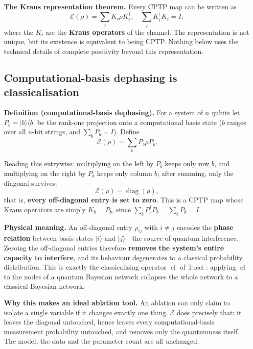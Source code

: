 \documentclass{article}
\begin{document}
\textbf{The Kraus representation theorem.} Every CPTP map can be written
as
\[\mathcal{E}(\rho) = \sum_{i}K_{i}\rho K_{i}^{\dagger},\quad\sum_{i}K_{i}^{\dagger}K_{i} = I,\]
where the \(K_{i}\) are the \textbf{Kraus operators} of the channel. The
representation is not unique, but its existence is equivalent to being
CPTP. Nothing below uses the technical details of complete positivity
beyond this representation.

\subsection{Computational-basis dephasing is classicalisation}

\textbf{Definition (computational-basis dephasing).} For a system of
\(n\) qubits let \(P_{b} = |b\rangle\langle b|\) be the rank-one
projection onto a computational basis state (\(b\) ranges over all
\(n\)-bit strings, and \(\sum_{b}P_{b} = I\)). Define
\[\mathcal{E}(\rho) = \sum_{b}P_{b}\rho P_{b}.\]

Reading this entrywise: multiplying on the left by \(P_{b}\) keeps only
row \(b\), and multiplying on the right by \(P_{b}\) keeps only column
\(b\); after summing, only the diagonal survives:
\[\mathcal{E}(\rho) = \operatorname{diag}(\rho),\] that is,
\textbf{every off-diagonal entry is set to zero}. This is a CPTP map
whose Kraus operators are simply \(K_{b} = P_{b}\), since
\(\sum_{b}P_{b}^{\dagger}P_{b} = \sum_{b}P_{b} = I\).

\textbf{Physical meaning.} An off-diagonal entry \(\rho_{ij}\) with
\(i \neq j\) encodes the \textbf{phase relation} between basis states
\(|i\rangle\) and \(|j\rangle\)---the source of quantum interference.
Zeroing the off-diagonal entries therefore \textbf{removes the system's
entire capacity to interfere}, and its behaviour degenerates to a
classical probability distribution. This is exactly the classicalising
operator \(\operatorname{cl}\) of Tucci \cite{tucci2012}: applying
\(\operatorname{cl}\) to the nodes of a quantum Bayesian network
collapses the whole network to a classical Bayesian network.

\textbf{Why this makes an ideal ablation tool.} An ablation can only
claim to isolate a single variable if it changes exactly one thing.
\(\mathcal{E}\) does precisely that: it leaves the diagonal untouched,
hence leaves every computational-basis measurement probability
untouched, and removes only the quantumness itself. The model, the data
and the parameter count are all unchanged.
\end{document}
